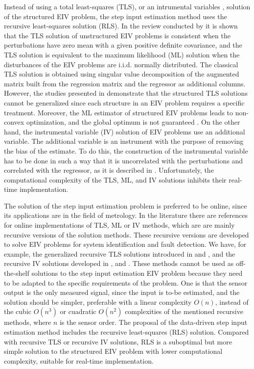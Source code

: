 Instead of using a total least-squares (TLS), \color{blue} or an intrumental variables \color{black}, solution of the structured EIV problem, the step input estimation method uses the recursive least-squares solution (RLS). 
In the review conducted by \citet{Markovsky07overview} it is shown that the TLS solution of unstructured EIV problems is consistent when the perturbations have zero mean with a given positive definite covariance, and
the TLS solution is equivalent to the maximum likelihood (ML) solution when the disturbances of the EIV problems are i.i.d. normally distributed. 
\color{blue} The classical TLS solution is obtained using singular value decomposition of the augmented matrix built from the regression matrix and the regressor as additional columns\color{black}.
However, the studies presented in \citet{VanHuffel07TLSeditorial} demonstrate that the structured TLS solutions cannot be generalized since each structure in an EIV problem requires a specific treatment. 
Moreover, the ML estimator of structured EIV problems leads to non-convex optimization, and the global optimum is not guaranteed \cite{Beck10}.
\color{blue} On the other hand, the instrumental variable (IV) solution of EIV problems use an additional variable.
The additional variable is an instrument with the purpose of removing the bias of the estimate.
To do this, the construction of the instrumental variable has to be done in such a way that it is uncorrelated with the perturbations and correlated with the regressor, as it is described in \citet{Soderstrom18}. 
\color{black} 
Unfortunately, the computational complexity of the TLS, ML, and IV solutions inhibits their real-time implementation.

\color{blue} 
The solution of the step input estimation problem is preferred to be online, since its applications are in the field of metrology.
In the literature there are references for online implementations of TLS, ML or IV methods, which are are mainly recursive versions of the solution methods.
These recursive versions are developed to solve EIV problems for system identification and fault detection.
We have, for example, the generalized recursive TLS solutions introduced in \citet{Rhode14recursive} and \citet{Rhode14recursivecov}, and the recursive IV solutions developed in \citet{Djouambi12}, \citet{Shang16} and \citet{Gil15}.
These methods cannot be used as off-the-shelf solutions to the step input estimation EIV problem because they need to be adapted to the specific requirements of the problem.
One is that the sensor output is the only measured signal, since the input is to-be estimated, and the solution should be simpler, preferable with a linear complexity $O(n)$, instead of the cubic $O(n^3)$ or cuadratic $O(n^2)$ complexities of the mentioned recursive methods, where $n$ is the sensor order.
The proposal of the data-driven step input estimation method includes the recursive least-squares (RLS) solution.
Compared with recursive TLS or recursive IV solutions, RLS is a suboptimal but more simple solution to the structured EIV problem with lower computational complexity,  suitable for real-time implementation.
\color{black} 


